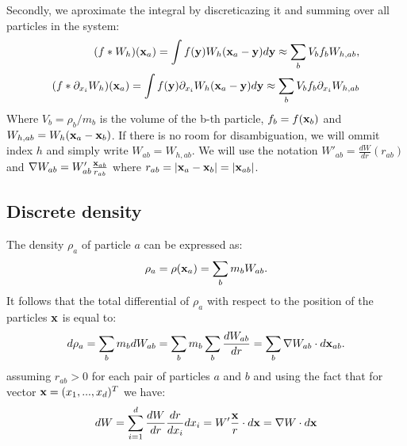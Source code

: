 Secondly, we aproximate the integral by discreticazing it and summing over all particles in the system:
\begin{equation}
    \begin{aligned}
            (f * W_h)({\mathbf{x}}_a) = \int f(\mathbf{y}) W_h({\mathbf{x}}_{a} - \mathbf{y}) d\mathbf{y} \approx \sum_{b}  V_b f_b W_{h, ab}, \\
            (f * {\partial}_{x_i} W_h)({\mathbf{x}}_a) = \int f(\mathbf{y}) {\partial}_{x_i} W_h({\mathbf{x}}_a - \mathbf{y}) d\mathbf{y} \approx \sum_{b}  V_b f_b {\partial}_{x_i} W_{h, ab}
    \label{eq:aproxsph}           
    \end{aligned}
\end{equation}
Where $V_b = \rho_b / m_b$ is the volume of the b-th particle, $f_b = f({\mathbf{x}}_b)$ and $W_{h, ab} = W_h({\mathbf{x}}_a - {\mathbf{x}}_b)$.
If there is no room for disambiguation, we will ommit index $h$ and simply write $W_{ab} = W_{h, ab}$. We will use the notation $W'_{ab} = \frac{dW}{dr}(r_{ab})$
and $\nabla W_{ab} = W'_{ab} \frac{{\mathbf{x}}_{ab}}{r_{ab}}$ where $r_{ab} = |{\mathbf{x}}_a - {\mathbf{x}}_b| = |{\mathbf{x}}_{ab}|$.


\subsection{Discrete density}
The density $\rho_a$ of particle $a$ can be expressed as: 
\begin{equation}
    \rho_a = \rho({\mathbf{x}}_a) = \sum_{b} m_b W_{ab}.
\end{equation}
It follows that the total differential of $\rho_a$ with respect to the position of the particles $\mathbf{x}$ is equal to:
\begin{equation}
    d\rho_a = \sum_{b} m_b dW_{ab} = \sum_{b} m_b \sum_{b} \frac{dW_{ab}}{dr} = \sum_{b} \nabla W_{ab} \cdot d{\mathbf{x}}_{ab}.
\end{equation} 
assuming $r_{ab} > 0$ for each pair of particles $a$ and $b$ and using the fact that for vector $\mathbf{x} = (x_1,...,x_d)^T$ we have:
\begin{equation}
    dW = \sum_{i=1}^{d} \frac{dW}{dr} \frac{dr}{dx_i} dx_i =  W' \frac{\mathbf{x}}{r} \cdot d\mathbf{x} = \nabla W \cdot d\mathbf{x}
\end{equation}

